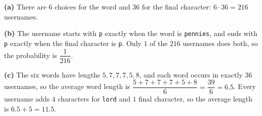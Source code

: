 \textbf{(a)} There are $6$ choices for the word and $36$ for the final character: $6\cdot36=\boxed{216}$ usernames.

\textbf{(b)} The username starts with \texttt{p} exactly when the word is \texttt{pennies}, and ends with \texttt{p} exactly when the final character is \texttt{p}. Only $1$ of the $216$ usernames does both, so the probability is $\boxed{\dfrac{1}{216}}$.

\textbf{(c)} The six words have lengths $5,7,7,7,5,8$, and each word occurs in exactly $36$ usernames, so the average word length is $\dfrac{5+7+7+7+5+8}{6}=\dfrac{39}{6}=6.5$. Every username adds $4$ characters for \texttt{lord} and $1$ final character, so the average length is $6.5+5=\boxed{11.5}$.
